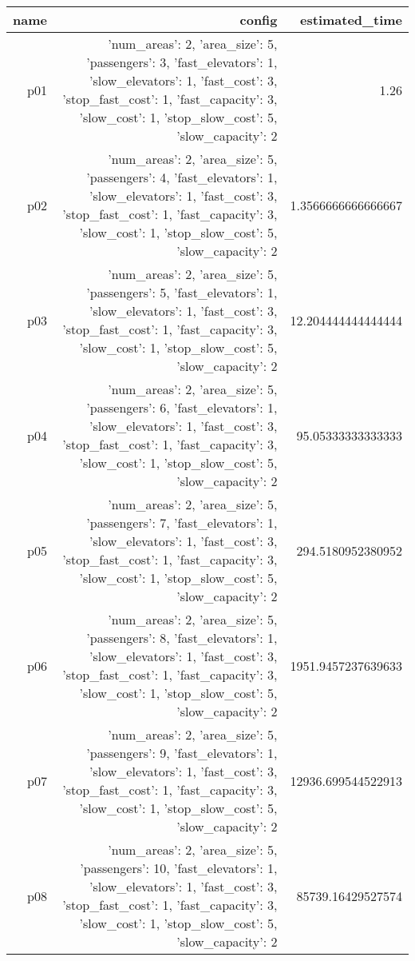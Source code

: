 \documentclass{article}
\begin{document}
                            \begin{center}
                            \scriptsize
                            \begin{tabular}{r|r|r}
                            name & config & estimated\_time\\\midrule
                              p01&{'num\_areas': 2, 'area\_size': 5, 'passengers': 3, 'fast\_elevators': 1, 'slow\_elevators': 1, 'fast\_cost': 3, 'stop\_fast\_cost': 1, 'fast\_capacity': 3, 'slow\_cost': 1, 'stop\_slow\_cost': 5, 'slow\_capacity': 2}&1.26\\
  p02&{'num\_areas': 2, 'area\_size': 5, 'passengers': 4, 'fast\_elevators': 1, 'slow\_elevators': 1, 'fast\_cost': 3, 'stop\_fast\_cost': 1, 'fast\_capacity': 3, 'slow\_cost': 1, 'stop\_slow\_cost': 5, 'slow\_capacity': 2}&1.3566666666666667\\
  p03&{'num\_areas': 2, 'area\_size': 5, 'passengers': 5, 'fast\_elevators': 1, 'slow\_elevators': 1, 'fast\_cost': 3, 'stop\_fast\_cost': 1, 'fast\_capacity': 3, 'slow\_cost': 1, 'stop\_slow\_cost': 5, 'slow\_capacity': 2}&12.204444444444444\\
  p04&{'num\_areas': 2, 'area\_size': 5, 'passengers': 6, 'fast\_elevators': 1, 'slow\_elevators': 1, 'fast\_cost': 3, 'stop\_fast\_cost': 1, 'fast\_capacity': 3, 'slow\_cost': 1, 'stop\_slow\_cost': 5, 'slow\_capacity': 2}&95.05333333333333\\
  p05&{'num\_areas': 2, 'area\_size': 5, 'passengers': 7, 'fast\_elevators': 1, 'slow\_elevators': 1, 'fast\_cost': 3, 'stop\_fast\_cost': 1, 'fast\_capacity': 3, 'slow\_cost': 1, 'stop\_slow\_cost': 5, 'slow\_capacity': 2}&294.5180952380952\\
  p06&{'num\_areas': 2, 'area\_size': 5, 'passengers': 8, 'fast\_elevators': 1, 'slow\_elevators': 1, 'fast\_cost': 3, 'stop\_fast\_cost': 1, 'fast\_capacity': 3, 'slow\_cost': 1, 'stop\_slow\_cost': 5, 'slow\_capacity': 2}&1951.9457237639633\\
  p07&{'num\_areas': 2, 'area\_size': 5, 'passengers': 9, 'fast\_elevators': 1, 'slow\_elevators': 1, 'fast\_cost': 3, 'stop\_fast\_cost': 1, 'fast\_capacity': 3, 'slow\_cost': 1, 'stop\_slow\_cost': 5, 'slow\_capacity': 2}&12936.699544522913\\
  p08&{'num\_areas': 2, 'area\_size': 5, 'passengers': 10, 'fast\_elevators': 1, 'slow\_elevators': 1, 'fast\_cost': 3, 'stop\_fast\_cost': 1, 'fast\_capacity': 3, 'slow\_cost': 1, 'stop\_slow\_cost': 5, 'slow\_capacity': 2}&85739.16429527574\\

\end{tabular}
\end{center}
\end{document}
